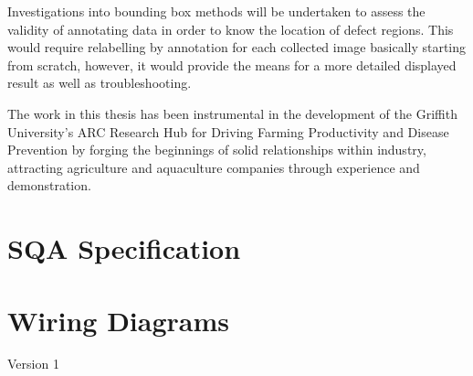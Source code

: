 \documentclass[fleqn,twoside,12pt]{report}
\begin{document}
Investigations into bounding box methods will be undertaken to assess the validity of annotating data in order to know the location of defect regions. This would require relabelling by annotation for each collected image basically starting from scratch, however, it would provide the means for a more detailed displayed result as well as troubleshooting.

The work in this thesis has been instrumental in the development of the Griffith University's ARC Research Hub for Driving Farming Productivity and Disease Prevention by forging the beginnings of solid relationships within industry, attracting agriculture and aquaculture companies through experience and demonstration. 




\newpage





\newpage
\appendix
\chapter{SQA Specification}
\label{app:sqa_specs}


\begin{minipage}[b]{0.9\linewidth}
	
\end{minipage}




\newpage

\chapter{Wiring Diagrams}
\label{app:wiring}

Version 1
\begin{minipage}[b]{0.9\linewidth}
	
\end{minipage}
\end{document}

